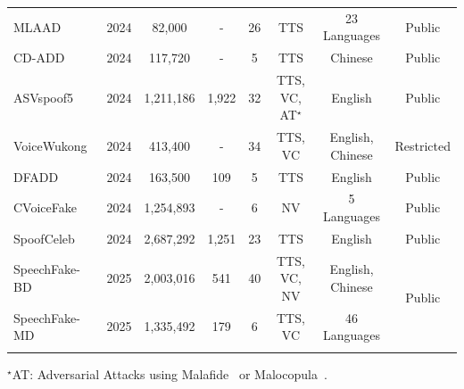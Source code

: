 \begin{table}[tb]
{\begin{tabular}{l||c|c|c|c|c|c|c}
    MLAAD~\cite{muller2024mlaad} & 2024 & 82,000 & - & 26 & TTS & 23 Languages & Public \\ %
    CD-ADD~\cite{li2024cross} & 2024 & 117,720 & - & 5 & TTS & Chinese & Public \\ %
    ASVspoof5~\cite{wang2024asvspoof} & 2024 & 1,211,186 & 1,922 & 32 & TTS, VC, AT$^\star$ & English & Public \\ %
    VoiceWukong~\cite{yan2024voicewukong} & 2024 & 413,400 & - & 34 & TTS, VC & English, Chinese & Restricted \\ %
    DFADD~\cite{du2024dfadd} & 2024 & 163,500 & 109 & 5 & TTS & English & Public \\
    CVoiceFake~\cite{li2024safeear} & 2024 & 1,254,893 & - & 6 & NV & 5 Languages & Public \\
    SpoofCeleb~\cite{jung2025spoofceleb} & 2024 & 2,687,292 & 1,251 & 23 & TTS & English & Public \\
    \hline
    SpeechFake-BD & 2025 & 2,003,016 & 541 & 40 & TTS, VC, NV & English, Chinese & \multirow{2}{*}{Public} \\
    SpeechFake-MD & 2025 & 1,335,492 & 179 & 6 & TTS, VC &  46 Languages &  \\
    \Xhline{1px}
    \end{tabular}}
    \begin{tablenotes}
    \item\scriptsize $^\star$AT: Adversarial Attacks using Malafide~\cite{panariello2023malafide} or Malocopula~\cite{todisco2024malacopula}.
    \end{tablenotes}
\end{table}

